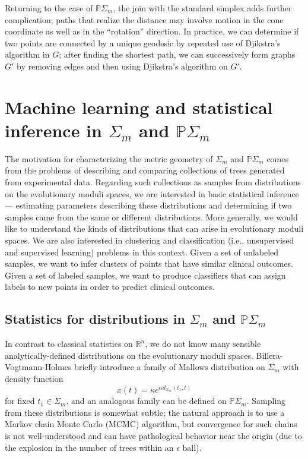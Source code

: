 \documentclass[a4paper,11pt]{article}
\begin{document}
Returning to the case of $\mathbb{P}\Sigma_m$, the join with the standard simplex adds further complication; paths that realize the distance may involve motion in the cone coordinate as well as in the ``rotation'' direction.
In practice, we can determine if two points are connected by a unique geodesic by repeated use of Djikstra's algorithm in $G$; after finding the shortest path, we can successively form graphs $G'$ by removing edges and then using Djikstra's algorithm on $G'$.


\section{Machine learning and statistical inference in $\Sigma_m$ and $\mathbb{P}\Sigma_m$}\label{sec:ML}

The motivation for characterizing the metric geometry of $\Sigma_m$ and $\mathbb{P}\Sigma_m$ comes from the problems of describing and comparing collections of trees generated from experimental data.
Regarding such collections as samples from distributions on the evolutionary moduli spaces, we are interested in basic statistical inference --- estimating parameters describing these distributions and determining if two samples came from the same or different distributions.
More generally, we would like to understand the kinds of distributions that can arise in evolutionary moduli spaces.
We are also interested in clustering and classification (i.e., unsupervised and supervised learning) problems in this context.
Given a set of unlabeled samples, we want to infer clusters of points that have similar clinical outcomes.
Given a set of labeled samples, we want to produce classifiers that can assign labels to new points in order to predict clinical outcomes.

\subsection{Statistics for distributions in $\Sigma_m$ and $\mathbb{P}\Sigma_m$}

In contrast to classical statistics on $\mathbb{R}^n$, we do not know many sensible analytically-defined distributions on the evolutionary moduli spaces.
Billera-Vogtmann-Holmes briefly introduce a family of Mallows distribution on $\Sigma_m$ with density function
\[
x(t) = \kappa e^{\alpha d_{\Sigma_m}(t_1, t)}
\] 
for fixed $t_1 \in \Sigma_m$, and an analogous family can be defined on $\mathbb{P}\Sigma_m$.
Sampling from these distributions is somewhat subtle; the natural approach is to use a Markov chain Monte Carlo (MCMC) algorithm, but convergence for such chains is not well-understood and can have pathological behavior near the origin (due to the explosion in the number of trees within an $\epsilon$ ball).
\end{document}
